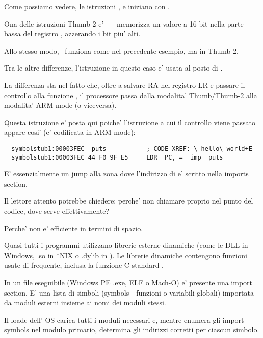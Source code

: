 
Come possiamo vedere, le istruzioni ,  e  iniziano con .

Ona delle istruzioni Thumb-2 e'  ~---memorizza un valore a 16-bit nella parte bassa del registro  ,
azzerando i bit piu' alti.

Allo stesso modo,  ~funziona come  nel precedente esempio, ma in Thumb-2.


Tra le altre differenze, l'istruzione  in questo caso e' usata al posto di .

La differenza sta nel fatto che, oltre a salvare \ac{RA} nel registro \ac{LR} e passare il controllo alla funzione \puts,
il processore passa dalla modalita' Thumb/Thumb-2 alla modalita' ARM mode (o viceversa).

Questa istruzione e' posta qui poiche' l'istruzione a cui il controllo viene passato appare cosi' (e' codificata in ARM mode):

\begin{lstlisting}[style=customasmARM]
__symbolstub1:00003FEC _puts           ; CODE XREF: \_hello\_world+E
__symbolstub1:00003FEC 44 F0 9F E5     LDR  PC, =__imp__puts
\end{lstlisting}

E' essenzialmente un jump alla zona dove l'indirizzo di \puts e' scritto nella imports section.

Il lettore attento potrebbe chiedere: perche' non chiamare \puts proprio nel punto del codice, dove serve effettivamente?

Perche' non e' efficiente in termini di spazio.

Quasi tutti i programmi utilizzano librerie esterne dinamiche (come le DLL in Windows, .so in *NIX o .dylib in \MacOSX).
Le librerie dinamiche contengono funzioni usate di frequente, inclusa la funzione C standard \puts.

In un file eseguibile (Windows PE .exe, ELF o Mach-O) e' presente una import section.
E' una lista di simboli (symbols - funzioni o variabili globali) importata da moduli esterni insieme ai nomi dei moduli stessi.

Il loade dell' \ac{OS} carica tutti i moduli necessari e, mentre enumera gli import symbols nel modulo primario, determina gli indirizzi
corretti per ciascun simbolo.

